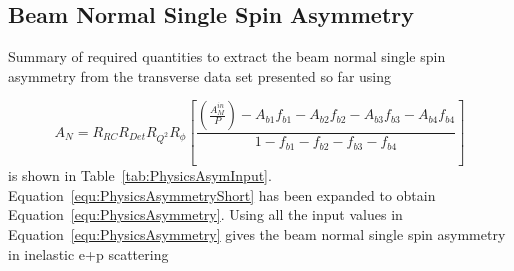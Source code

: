 \subsection{Beam Normal Single Spin Asymmetry}
Summary of required quantities to extract the beam normal single spin asymmetry from the transverse data set presented so far using

\begin{equation} \label{equ:PhysicsAsymmetry}
A_{N} = R_{RC}R_{Det}R_{Q^{2}}R_{\phi} \left[ \frac{\left(\frac{A^{in}_{M}}{P}\right) - A_{b1}f_{b1} - A_{b2}f_{b2} - A_{b3}f_{b3} - A_{b4}f_{b4} }{1 - f_{b1} - f_{b2} - f_{b3} - f_{b4}} \right] 
\end{equation}
is shown in Table~\ref{tab:PhysicsAsymInput}. Equation~\ref{equ:PhysicsAsymmetryShort} has been expanded to obtain Equation~\ref{equ:PhysicsAsymmetry}. 
Using all the input values in Equation~\ref{equ:PhysicsAsymmetry} gives the beam normal single spin asymmetry in inelastic e+p scattering

